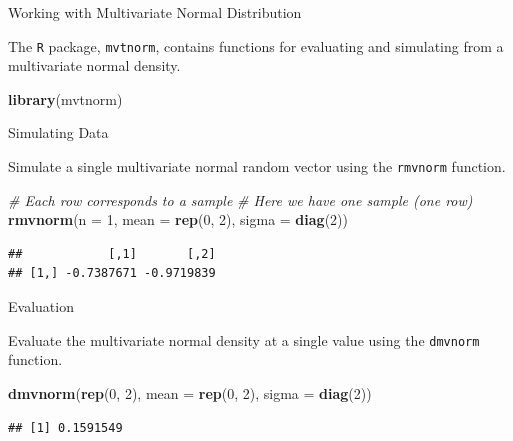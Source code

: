 \documentclass[
  ignorenonframetext,
]{beamer}
\newenvironment{Shaded}{\begin{snugshade}}{\end{snugshade}}
\newcommand{\CommentTok}[1]{\textcolor[rgb]{0.56,0.35,0.01}{\textit{#1}}}
\newcommand{\DataTypeTok}[1]{\textcolor[rgb]{0.13,0.29,0.53}{#1}}
\newcommand{\DecValTok}[1]{\textcolor[rgb]{0.00,0.00,0.81}{#1}}
\newcommand{\KeywordTok}[1]{\textcolor[rgb]{0.13,0.29,0.53}{\textbf{#1}}}
\newcommand{\NormalTok}[1]{#1}
\begin{document}
\begin{frame}[fragile]{Working with Multivariate Normal Distribution}
\protect\hypertarget{working-with-multivariate-normal-distribution}{}

The \texttt{R} package, \texttt{mvtnorm}, contains functions for
evaluating and simulating from a multivariate normal density.

\begin{Shaded}
\begin{Highlighting}[]
\KeywordTok{library}\NormalTok{(mvtnorm)}
\end{Highlighting}
\end{Shaded}

\end{frame}

\begin{frame}[fragile]{Simulating Data}
\protect\hypertarget{simulating-data}{}

Simulate a single multivariate normal random vector using the
\texttt{rmvnorm} function.

\begin{Shaded}
\begin{Highlighting}[]
\CommentTok{# Each row corresponds to a sample}
\CommentTok{# Here we have one sample (one row)}
\KeywordTok{rmvnorm}\NormalTok{(}\DataTypeTok{n =} \DecValTok{1}\NormalTok{, }\DataTypeTok{mean =} \KeywordTok{rep}\NormalTok{(}\DecValTok{0}\NormalTok{, }\DecValTok{2}\NormalTok{), }\DataTypeTok{sigma =} \KeywordTok{diag}\NormalTok{(}\DecValTok{2}\NormalTok{))}
\end{Highlighting}
\end{Shaded}

\begin{verbatim}
##            [,1]       [,2]
## [1,] -0.7387671 -0.9719839
\end{verbatim}

\end{frame}

\begin{frame}[fragile]{Evaluation}
\protect\hypertarget{evaluation}{}

Evaluate the multivariate normal density at a single value using the
\texttt{dmvnorm} function.

\begin{Shaded}
\begin{Highlighting}[]
\KeywordTok{dmvnorm}\NormalTok{(}\KeywordTok{rep}\NormalTok{(}\DecValTok{0}\NormalTok{, }\DecValTok{2}\NormalTok{), }\DataTypeTok{mean =} \KeywordTok{rep}\NormalTok{(}\DecValTok{0}\NormalTok{, }\DecValTok{2}\NormalTok{), }\DataTypeTok{sigma =} \KeywordTok{diag}\NormalTok{(}\DecValTok{2}\NormalTok{))}
\end{Highlighting}
\end{Shaded}

\begin{verbatim}
## [1] 0.1591549
\end{verbatim}

\end{frame}
\end{document}
